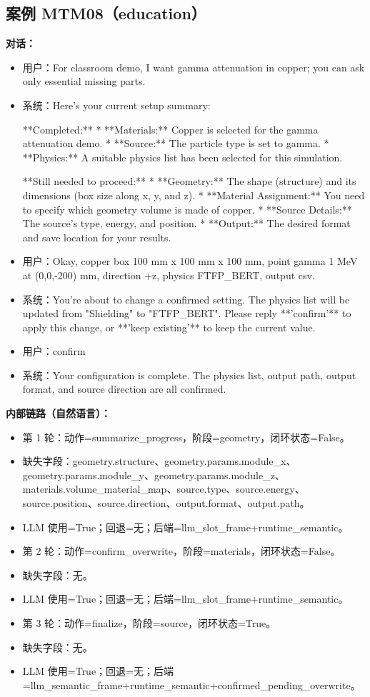 \documentclass[11pt]{ctexart}
\begin{document}
\subsection{案例 MTM08（education）}
\textbf{对话：}
\begin{itemize}
\item 用户：For classroom demo, I want gamma attenuation in copper; you can ask only essential missing parts.
\item 系统：Here's your current setup summary:

**Completed:**
*   **Materials:** Copper is selected for the gamma attenuation demo.
*   **Source:** The particle type is set to gamma.
*   **Physics:** A suitable physics list has been selected for this simulation.

**Still needed to proceed:**
*   **Geometry:** The shape (structure) and its dimensions (box size along x, y, and z).
*   **Material Assignment:** You need to specify which geometry volume is made of copper.
*   **Source Details:** The source's type, energy, and position.
*   **Output:** The desired format and save location for your results.
\item 用户：Okay, copper box 100 mm x 100 mm x 100 mm, point gamma 1 MeV at (0,0,-200) mm, direction +z, physics FTFP\_BERT, output csv.
\item 系统：You're about to change a confirmed setting. The physics list will be updated from "Shielding" to "FTFP\_BERT". Please reply **'confirm'** to apply this change, or **'keep existing'** to keep the current value.
\item 用户：confirm
\item 系统：Your configuration is complete. The physics list, output path, output format, and source direction are all confirmed.
\end{itemize}
\textbf{内部链路（自然语言）：}
\begin{itemize}
\item 第 1 轮：动作=summarize\_progress，阶段=geometry，闭环状态=False。
\item 缺失字段：geometry.structure、geometry.params.module\_x、geometry.params.module\_y、geometry.params.module\_z、materials.volume\_material\_map、source.type、source.energy、source.position、source.direction、output.format、output.path。
\item LLM 使用=True；回退=无；后端=llm\_slot\_frame+runtime\_semantic。
\item 第 2 轮：动作=confirm\_overwrite，阶段=materials，闭环状态=False。
\item 缺失字段：无。
\item LLM 使用=True；回退=无；后端=llm\_slot\_frame+runtime\_semantic。
\item 第 3 轮：动作=finalize，阶段=source，闭环状态=True。
\item 缺失字段：无。
\item LLM 使用=True；回退=无；后端=llm\_semantic\_frame+runtime\_semantic+confirmed\_pending\_overwrite。
\end{itemize}
\end{document}
